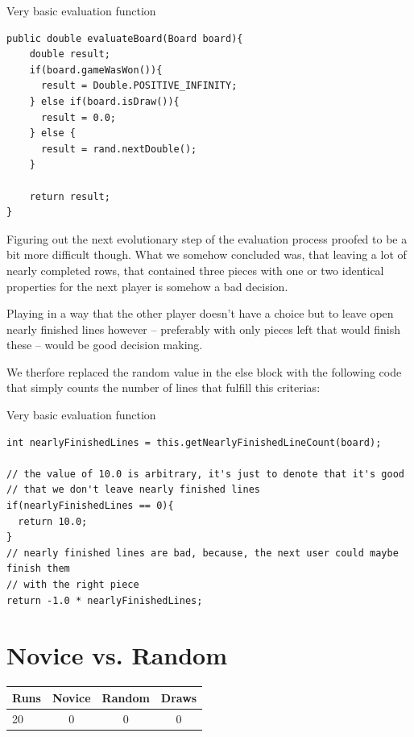 \documentclass{scrartcl}
\begin{document}
\begin{listing}[H]
\caption{Very basic evaluation function}
\begin{verbatim}
public double evaluateBoard(Board board){
    double result;
    if(board.gameWasWon()){
      result = Double.POSITIVE_INFINITY;
    } else if(board.isDraw()){
      result = 0.0;
    } else {
      result = rand.nextDouble();
    }

    return result;
}
\end{verbatim}
\end{listing}

Figuring out the next evolutionary step of the evaluation process proofed to be a bit more difficult though. What we somehow concluded was, that leaving a lot of nearly completed rows, that contained three pieces with one or two identical properties for the next player is somehow a bad decision.

Playing in a way that the other player doesn't have a choice but to leave open nearly finished lines however -- preferably with only pieces left that would finish these -- would be good decision making.

We therfore replaced the random value in the else block with the following code that simply counts the number of lines that fulfill this criterias:

\begin{listing}[H]
\caption{Very basic evaluation function}
\begin{verbatim}
int nearlyFinishedLines = this.getNearlyFinishedLineCount(board);

// the value of 10.0 is arbitrary, it's just to denote that it's good 
// that we don't leave nearly finished lines
if(nearlyFinishedLines == 0){
  return 10.0;
}
// nearly finished lines are bad, because, the next user could maybe finish them 
// with the right piece
return -1.0 * nearlyFinishedLines;
\end{verbatim}
\end{listing}


\section{Novice vs. Random}

\begin{tabular}{l c c c}
Runs & Novice & Random & Draws \\
\hline
20 & 0 & 0 & 0  \\
\end{tabular}
\end{document}
